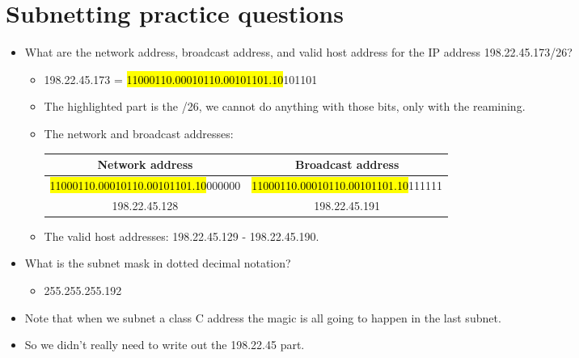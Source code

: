 \section{Subnetting practice questions}
\begin{itemize}
    \item What are the network address, broadcast address, and valid host address for the IP address 198.22.45.173/26?
        \begin{itemize}
            \item 198.22.45.173 = \hl{11000110.00010110.00101101.10}101101
            \item The highlighted part is the /26, we cannot do anything with those bits, only with the reamining.
            \item The network and broadcast addresses:
                \begin{tabular}{|c|c|}
                    \hline
                    Network address & Broadcast address \\
                    \hline
                        \hl{11000110.00010110.00101101.10}000000 & 
                        \hl{11000110.00010110.00101101.10}111111 \\
                    \hline
                        198.22.45.128 &
                        198.22.45.191
                     \\
                    \hline
                \end{tabular}
            
            \item The valid host addresses: 198.22.45.129 - 198.22.45.190.
        \end{itemize}

    \item What is the subnet mask in dotted decimal notation? 
        \begin{itemize}
            \item 255.255.255.192
        \end{itemize}
    
    \item Note that when we subnet a class C address the magic is all going to happen in the last subnet.
    \item So we didn't really need to write out the 198.22.45 part.
\end{itemize}

